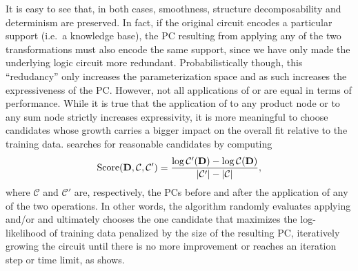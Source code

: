 It is easy to see that, in both cases, smoothness, structure decomposability and determinism are
preserved. In fact, if the original circuit encodes a particular support (i.e.\ a knowledge base),
the PC resulting from applying any of the two transformations must also encode the same support,
since we have only made the underlying logic circuit more redundant. Probabilistically though, this
``redudancy'' only increases the parameterization space and as such increases the expressiveness of
the PC. However, not all applications of  or  are equal in terms of
performance. While it is true that the application of  to any product node or
 to any sum node strictly increases expressivity, it is more meaningful to choose
candidates whose growth carries a bigger impact on the overall fit relative to the training data.
 searches for reasonable candidates by computing
\begin{equation*}
  \operatorname{\normalfont{Score}}(\mathbf{D}, \mathcal{C}, \mathcal{C}')=\frac{\log\mathcal{C}'(\mathbf{D})-\log
  \mathcal{C}(\mathbf{D})}{|\mathcal{C}'|-|\mathcal{C}|},
\end{equation*}
where $\mathcal{C}$ and $\mathcal{C}'$ are, respectively, the PCs before and after the application
of any of the two operations. In other words, the algorithm randomly evaluates applying
 and/or  and ultimately chooses the one candidate that maximizes
the log-likelihood of training data penalized by the size of the resulting PC, iteratively growing
the circuit until there is no more improvement or reaches an iteration step or time limit, as
 shows.

